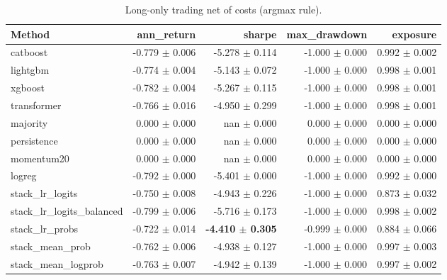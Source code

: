 \begin{table}[t]
\centering
\scriptsize
\caption{Long-only trading net of costs (argmax rule).}
\label{tab:trading_argmax}
\begin{tabular}{lrrrr}
\toprule
Method & ann\_return & sharpe & max\_drawdown & exposure \\
\midrule
catboost & -0.779 $\pm$ 0.006 & -5.278 $\pm$ 0.114 & -1.000 $\pm$ 0.000 & 0.992 $\pm$ 0.002 \\
lightgbm & -0.774 $\pm$ 0.004 & -5.143 $\pm$ 0.072 & -1.000 $\pm$ 0.000 & 0.998 $\pm$ 0.001 \\
xgboost & -0.782 $\pm$ 0.004 & -5.267 $\pm$ 0.115 & -1.000 $\pm$ 0.000 & 0.998 $\pm$ 0.001 \\
transformer & -0.766 $\pm$ 0.016 & -4.950 $\pm$ 0.299 & -1.000 $\pm$ 0.000 & 0.998 $\pm$ 0.001 \\
majority & 0.000 $\pm$ 0.000 & nan $\pm$ 0.000 & 0.000 $\pm$ 0.000 & 0.000 $\pm$ 0.000 \\
persistence & 0.000 $\pm$ 0.000 & nan $\pm$ 0.000 & 0.000 $\pm$ 0.000 & 0.000 $\pm$ 0.000 \\
momentum20 & 0.000 $\pm$ 0.000 & nan $\pm$ 0.000 & 0.000 $\pm$ 0.000 & 0.000 $\pm$ 0.000 \\
logreg & -0.792 $\pm$ 0.000 & -5.401 $\pm$ 0.000 & -1.000 $\pm$ 0.000 & 0.992 $\pm$ 0.000 \\
stack\_lr\_logits & -0.750 $\pm$ 0.008 & -4.943 $\pm$ 0.226 & -1.000 $\pm$ 0.000 & 0.873 $\pm$ 0.032 \\
stack\_lr\_logits\_balanced & -0.799 $\pm$ 0.006 & -5.716 $\pm$ 0.173 & -1.000 $\pm$ 0.000 & 0.998 $\pm$ 0.002 \\
stack\_lr\_probs & -0.722 $\pm$ 0.014 & \textbf{-4.410 $\pm$ 0.305} & -0.999 $\pm$ 0.000 & 0.884 $\pm$ 0.066 \\
stack\_mean\_prob & -0.762 $\pm$ 0.006 & -4.938 $\pm$ 0.127 & -1.000 $\pm$ 0.000 & 0.997 $\pm$ 0.003 \\
stack\_mean\_logprob & -0.763 $\pm$ 0.007 & -4.942 $\pm$ 0.139 & -1.000 $\pm$ 0.000 & 0.997 $\pm$ 0.002 \\
\bottomrule
\end{tabular}
\end{table}